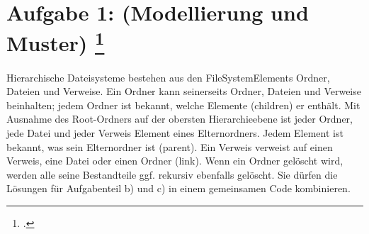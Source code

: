 \documentclass{lehramt-informatik-aufgabe}
\begin{document}
\section{Aufgabe 1: (Modellierung und Muster)
\footcite{examen:66116:2019:09}}

Hierarchische Dateisysteme bestehen aus den FileSystemElements Ordner,
Dateien und Verweise. Ein Ordner kann seinerseits Ordner, Dateien und
Verweise beinhalten; jedem Ordner ist bekannt, welche Elemente
(children) er enthält. Mit Ausnahme des Root-Ordners auf der obersten
Hierarchieebene ist jeder Ordner, jede Datei und jeder Verweis Element
eines Elternordners. Jedem Element ist bekannt, was sein Elternordner
ist (parent). Ein Verweis verweist auf einen Verweis, eine Datei oder
einen Ordner (link). Wenn ein Ordner gelöscht wird, werden alle seine
Bestandteile ggf. rekursiv ebenfalls gelöscht. Sie dürfen die Lösungen
für Aufgabenteil b) und c) in einem gemeinsamen Code kombinieren.
\end{document}
